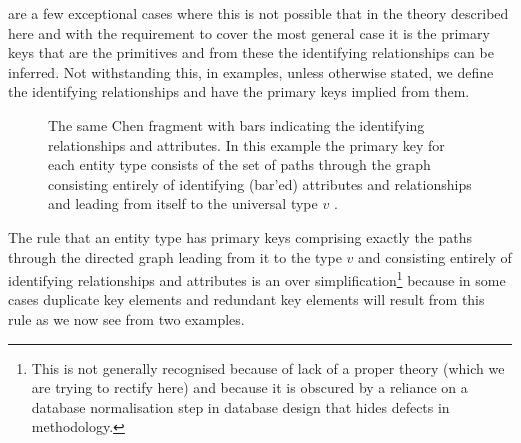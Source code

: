 \documentclass[10pt,a4paper]{article}
\newcommand{\veee}{v}
\begin{document}
are a few exceptional cases where this is not possible that in the theory described here and 
with the requirement to cover the most general case
it is the primary keys that are the primitives and
from these the identifying relationships can be inferred.  
Not withstanding this, in examples, unless otherwise stated,
we define the identifying relationships and have the primary keys implied from them. 
\begin{figure} [h]  %
\begin{center}
\barstrue

\end{center}
\caption{The same Chen fragment with bars indicating the identifying relationships and attributes. In this example the primary key for each entity type consists of the set of paths through the graph consisting entirely
of identifying (bar'ed) attributes and relationships and leading from itself to the universal type $\veee$ .}
\label{chenfragment}
\end{figure}

The rule that an entity type has primary keys comprising exactly the paths through the directed graph leading from it
to the type $\veee$ and consisting entirely of identifying relationships and attributes is 
an over simplification\footnote{This is not generally recognised because 
of lack of a proper theory (which we are trying to rectify  here) and because it is obscured by a reliance on
a database normalisation step in database design that hides defects in methodology.}
because in some cases duplicate key elements and redundant key elements will result from this rule as we now see
from two examples.
\end{document}
